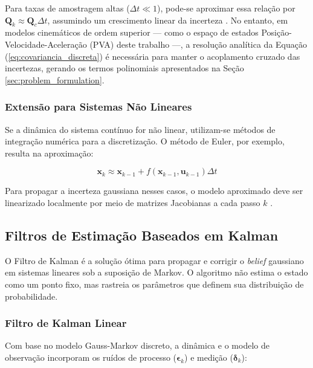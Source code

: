 Para taxas de amostragem altas ($\Delta t \ll 1$), pode-se aproximar essa relação por $\mathbf{Q}_k \approx \mathbf{Q}_c \Delta t$, assumindo um crescimento linear da incerteza \cite{simon2006optimal}. No entanto, em modelos cinemáticos de ordem superior — como o espaço de estados Posição-Velocidade-Aceleração (PVA) deste trabalho —, a resolução analítica da Equação (\ref{eq:covariancia_discreta}) é necessária para manter o acoplamento cruzado das incertezas, gerando os termos polinomiais apresentados na Seção \ref{sec:problem_formulation}.

\subsubsection*{Extensão para Sistemas Não Lineares}

Se a dinâmica do sistema contínuo for não linear, utilizam-se métodos de integração numérica para a discretização. O método de Euler, por exemplo, resulta na aproximação:

\begin{equation}
    \label{eq:nl_discreto}
    \mathbf{x}_k \approx \mathbf{x}_{k-1} + f(\mathbf{x}_{k-1}, \mathbf{u}_{k-1}) \Delta t
\end{equation}

Para propagar a incerteza gaussiana nesses casos, o modelo aproximado deve ser linearizado localmente por meio de matrizes Jacobianas a cada passo $k$ \cite{thrun2005probabilistic}.

\subsection{Filtros de Estimação Baseados em Kalman}
\label{subsec:Kalman}

O Filtro de Kalman é a solução ótima para propagar e corrigir o \textit{belief} gaussiano em sistemas lineares sob a suposição de Markov. O algoritmo não estima o estado como um ponto fixo, mas rastreia os parâmetros que definem sua distribuição de probabilidade.

\subsubsection{Filtro de Kalman Linear}
\label{subsubsec:KalmanLinear}

Com base no modelo Gauss-Markov discreto, a dinâmica e o modelo de observação incorporam os ruídos de processo ($\boldsymbol{\epsilon}_k$) e medição ($\boldsymbol{\delta}_k$):

